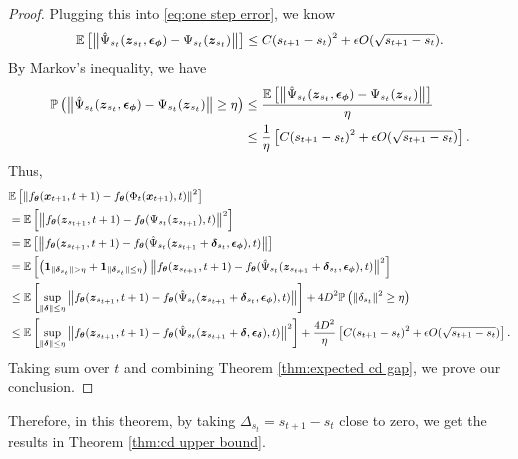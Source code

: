 \begin{proof}
	Plugging this into \eqref{eq:one step error}, we know 
	\begin{equation}
		\small
		\mathbb{E}\left[\left\|\hat{\Psi}_{s_{t}}(\boldsymbol{z}_{s_{t}}, \boldsymbol{\epsilon}_{\boldsymbol{\phi}}) - \Psi_{s_{t}}(\boldsymbol{z}_{s_{t}})\right\|\right] \leq C(s_{t + 1} - s_{t})^{2} + \epsilon O(\sqrt{s_{t + 1} - s_{t}}). 
	\end{equation}
	By Markov's inequality, we have 
	\begin{equation}
		\small
      \begin{aligned}
      \mathbb{P}\left(\left\|\hat{\Psi}_{s_{t}}(\boldsymbol{z}_{s_{t}}, \boldsymbol{\epsilon}_{\boldsymbol{\phi}}) - \Psi_{s_{t}}(\boldsymbol{z}_{s_{t}})\right\| \geq \eta\right) &\leq \frac{\mathbb{E}\left[\left\|\hat{\Psi}_{s_{t}}(\boldsymbol{z}_{s_{t}}, \boldsymbol{\epsilon}_{\boldsymbol{\phi}}) - \Psi_{s_{t}}(\boldsymbol{z}_{s_{t}})\right\|\right]}{\eta} \\
      & \leq \frac{1}{\eta}\left[C(s_{t + 1} - s_{t})^{2} + \epsilon O(\sqrt{s_{t + 1} - s_{t}})\right].
    \end{aligned}
	\end{equation}
	Thus, 
	\begin{equation}
		\small
		\begin{aligned}
			& \mathbb{E}\left[\left\|f_{\boldsymbol{\theta}}(\boldsymbol{x}_{t + 1}, t + 1) - f_{\boldsymbol{\theta}}(\Phi_{t}(\boldsymbol{x}_{t + 1}), t)\right\|^{2}\right] \\
            & = \mathbb{E}\left[\left\|f_{\boldsymbol{\theta}}(\boldsymbol{z}_{s_{t + 1}}, t + 1) - f_{\boldsymbol{\theta}}(\Psi_{s_{t}}(\boldsymbol{z}_{s_{t + 1}}), t)\right\|^{2}\right] \\
            & = \mathbb{E}\left[\left\|f_{\boldsymbol{\theta}}(\boldsymbol{z}_{s_{t + 1}}, t + 1) - f_{\boldsymbol{\theta}}(\hat{\Psi}_{s_{t}}(\boldsymbol{z}_{s_{t + 1}} + \boldsymbol{\delta}_{s_{t}}, \boldsymbol{\epsilon}_{\boldsymbol{\phi}}), t)\right\|\right] \\
			& = \mathbb{E}\left[\left(\textbf{1}_{\|\boldsymbol{\delta}_{s_{t}}\| > \eta} + \textbf{1}_{\|\boldsymbol{\delta}_{s_{t}}\| \leq \eta}\right)\left\|f_{\boldsymbol{\theta}}(\boldsymbol{z}_{s_{t + 1}}, t + 1) - f_{\boldsymbol{\theta}}(\hat{\Psi}_{s_{t}}(\boldsymbol{z}_{s_{t + 1}} + \boldsymbol{\delta}_{s_{t}}, \boldsymbol{\epsilon}_{\boldsymbol{\phi}}), t)\right\|^{2}\right] \\
			& \leq \mathbb{E}\left[\sup_{\|\boldsymbol{\delta}\| \leq \eta}\left\|f_{\boldsymbol{\theta}}(\boldsymbol{z}_{s_{t + 1}}, t + 1) - f_{\boldsymbol{\theta}}(\hat{\Psi}_{s_{t}}(\boldsymbol{z}_{s_{t + 1}} + \boldsymbol{\delta}_{s_{t}}, \boldsymbol{\epsilon}_{\boldsymbol{\phi}}), t)\right\|\right] + 4D^{2}\mathbb{P}\left(\left\|\delta_{s_{t}}\right\|^{2} \geq \eta\right) \\
			& \leq \mathbb{E}\left[\sup_{\|\boldsymbol{\delta}\| \leq \eta}\left\|f_{\boldsymbol{\theta}}(\boldsymbol{z}_{s_{t + 1}}, t + 1) - f_{\boldsymbol{\theta}}(\hat{\Psi}_{s_{t}}(\boldsymbol{z}_{s_{t + 1}} + \boldsymbol{\delta}, \boldsymbol{\epsilon}_{\boldsymbol{\delta}}), t)\right\|^{2}\right] + \frac{4D^{2}}{\eta}\left[C(s_{t + 1} - s_{t})^{2} + \epsilon O(\sqrt{s_{t + 1} - s_{t}})\right].
		\end{aligned}
	\end{equation}
	Taking sum over $t$ and combining Theorem \ref{thm:expected cd gap}, we prove our conclusion. 
\end{proof}
Therefore, in this theorem, by taking $\Delta_{s_{t}} = s_{t + 1} - s_{t}$ close to zero, we get the results in Theorem \ref{thm:cd upper bound}. 

